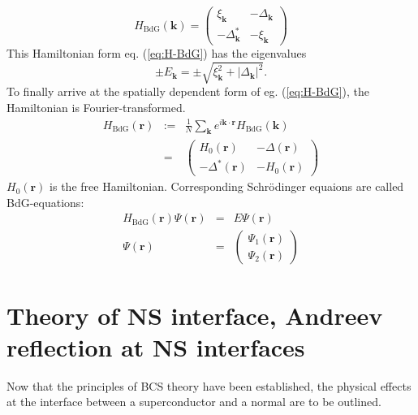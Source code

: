 \begin{equation}
H_\text{BdG}\left(\mathbf{k} \right) = \begin{pmatrix}
\xi_\mathbf{k} &  - \Delta_\mathbf{k}\\
- \Delta^*_\mathbf{k} & - \xi_\mathbf{k}
\end{pmatrix} \label{eq:H-BdG}
\end{equation}
This Hamiltonian form eq. (\ref{eq:H-BdG}) has the eigenvalues
\begin{equation}
 \pm E_\mathbf{k} = \pm \sqrt{\xi_\mathbf{k}^2 + |\Delta_\mathbf{k}|^2  }.
\end{equation}
To finally arrive at the spatially dependent form of eg. (\ref{eq:H-BdG}), the Hamiltonian is Fourier-transformed.
\begin{eqnarray}
H_\text{BdG} \left( \mathbf{r} \right) &:=& \frac{1}{N} \sum_\mathbf{k} e^{i \mathbf{k \cdot r}} H_\text{BdG}\left( \mathbf{k} \right) \\
&=& \begin{pmatrix}
H_0\left( \mathbf{r} \right)  &  - \Delta \left( \mathbf{r} \right) \\
- \Delta^* \left( \mathbf{r} \right)  & - H_0 \left( \mathbf{r} \right) 
\end{pmatrix} \label{eq:H-BdG-r}
\end{eqnarray}
$H_0 \left( \mathbf{r} \right) $ is the free Hamiltonian. Corresponding Schr\"odinger equaions are called BdG-equations:
\begin{eqnarray}
H_\text{BdG} \left( \mathbf{r} \right) \Psi\left( \mathbf{r} \right) &=& E \Psi\left( \mathbf{r} \right)\label{eq:BdG-eq} \\
\Psi\left( \mathbf{r} \right)  &=& \begin{pmatrix}
\Psi_1\left( \mathbf{r} \right) \\ \Psi_2\left( \mathbf{r} \right) 
\end{pmatrix}\label{eq:BdG-spinor}
\end{eqnarray}

\section{Theory of NS interface, Andreev reflection at NS interfaces}

Now that the principles of BCS theory have been established, the physical effects at the interface between a superconductor and a normal are to be outlined.

